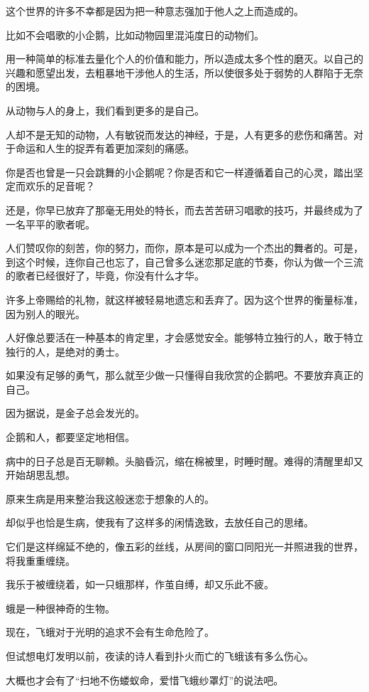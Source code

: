 		\vspace{1em}
		这个世界的许多不幸都是因为把一种意志强加于他人之上而造成的。\par
		比如不会唱歌的小企鹅，比如动物园里混沌度日的动物们。\par
		用一种简单的标准去量化个人的价值和能力，所以造成太多个性的磨灭。以自己的兴趣和愿望出发，去粗暴地干涉他人的生活，所以使很多处于弱势的人群陷于无奈的困境。\par
		从动物与人的身上，我们看到更多的是自己。\par
		人却不是无知的动物，人有敏锐而发达的神经，于是，人有更多的悲伤和痛苦。对于命运和人生的捉弄有着更加深刻的痛感。

		\vspace{1em}
		你是否也曾是一只会跳舞的小企鹅呢？你是否和它一样遵循着自己的心灵，踏出坚定而欢乐的足音呢？\par
		还是，你早已放弃了那毫无用处的特长，而去苦苦研习唱歌的技巧，并最终成为了一名平平的歌者呢。\par
		人们赞叹你的刻苦，你的努力，而你，原本是可以成为一个杰出的舞者的。可是，到这个时候，连你自己也忘了，自己曾多么迷恋那足底的节奏，你认为做一个三流的歌者已经很好了，毕竟，你没有什么才华。\par
		许多上帝赐给的礼物，就这样被轻易地遗忘和丢弃了。因为这个世界的衡量标准，因为别人的眼光。\par
		人好像总要活在一种基本的肯定里，才会感觉安全。能够特立独行的人，敢于特立独行的人，是绝对的勇士。\par
		如果没有足够的勇气，那么就至少做一只懂得自我欣赏的企鹅吧。不要放弃真正的自己。\par
		因为据说，是金子总会发光的。\par
		企鹅和人，都要坚定地相信。

	\endwriting



		病中的日子总是百无聊赖。头脑昏沉，缩在棉被里，时睡时醒。难得的清醒里却又开始胡思乱想。\par
		原来生病是用来整治我这般迷恋于想象的人的。\par
		却似乎也恰是生病，使我有了这样多的闲情逸致，去放任自己的思绪。

		它们是这样绵延不绝的，像五彩的丝线，从房间的窗口同阳光一并照进我的世界，将我重重缠绕。

		我乐于被缠绕着，如一只蛾那样，作茧自缚，却又乐此不疲。

		蛾是一种很神奇的生物。\par
		现在，飞蛾对于光明的追求不会有生命危险了。\par
		但试想电灯发明以前，夜读的诗人看到扑火而亡的飞蛾该有多么伤心。\par
		大概也才会有了“扫地不伤蝼蚁命，爱惜飞蛾纱罩灯”的说法吧。

